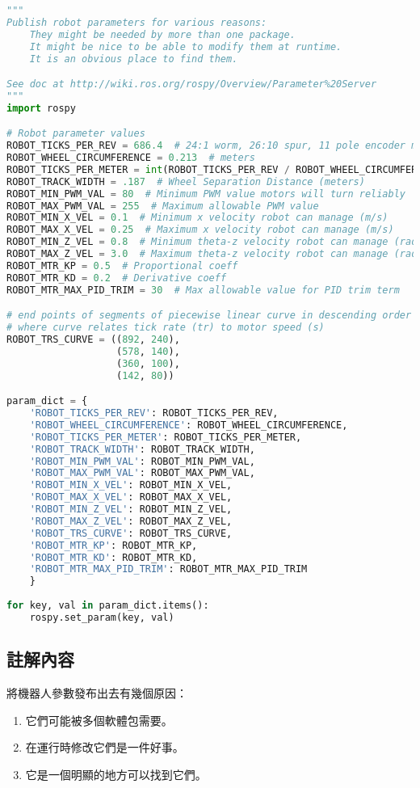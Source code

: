 
\begin{lstlisting}[language=Python, caption=publish\_params.py]
    """
Publish robot parameters for various reasons:
    They might be needed by more than one package.
    It might be nice to be able to modify them at runtime.
    It is an obvious place to find them.

See doc at http://wiki.ros.org/rospy/Overview/Parameter%20Server
"""
import rospy

# Robot parameter values
ROBOT_TICKS_PER_REV = 686.4  # 24:1 worm, 26:10 spur, 11 pole encoder magnet
ROBOT_WHEEL_CIRCUMFERENCE = 0.213  # meters
ROBOT_TICKS_PER_METER = int(ROBOT_TICKS_PER_REV / ROBOT_WHEEL_CIRCUMFERENCE)
ROBOT_TRACK_WIDTH = .187  # Wheel Separation Distance (meters)
ROBOT_MIN_PWM_VAL = 80  # Minimum PWM value motors will turn reliably
ROBOT_MAX_PWM_VAL = 255  # Maximum allowable PWM value
ROBOT_MIN_X_VEL = 0.1  # Minimum x velocity robot can manage (m/s)
ROBOT_MAX_X_VEL = 0.25  # Maximum x velocity robot can manage (m/s)
ROBOT_MIN_Z_VEL = 0.8  # Minimum theta-z velocity robot can manage (rad/s)
ROBOT_MAX_Z_VEL = 3.0  # Maximum theta-z velocity robot can manage (rad/s)
ROBOT_MTR_KP = 0.5  # Proportional coeff
ROBOT_MTR_KD = 0.2  # Derivative coeff
ROBOT_MTR_MAX_PID_TRIM = 30  # Max allowable value for PID trim term

# end points of segments of piecewise linear curve in descending order
# where curve relates tick rate (tr) to motor speed (s)
ROBOT_TRS_CURVE = ((892, 240),
                   (578, 140),
                   (360, 100),
                   (142, 80))

param_dict = {
    'ROBOT_TICKS_PER_REV': ROBOT_TICKS_PER_REV,
    'ROBOT_WHEEL_CIRCUMFERENCE': ROBOT_WHEEL_CIRCUMFERENCE,
    'ROBOT_TICKS_PER_METER': ROBOT_TICKS_PER_METER,
    'ROBOT_TRACK_WIDTH': ROBOT_TRACK_WIDTH,
    'ROBOT_MIN_PWM_VAL': ROBOT_MIN_PWM_VAL,
    'ROBOT_MAX_PWM_VAL': ROBOT_MAX_PWM_VAL,
    'ROBOT_MIN_X_VEL': ROBOT_MIN_X_VEL,
    'ROBOT_MAX_X_VEL': ROBOT_MAX_X_VEL,
    'ROBOT_MIN_Z_VEL': ROBOT_MIN_Z_VEL,
    'ROBOT_MAX_Z_VEL': ROBOT_MAX_Z_VEL,
    'ROBOT_TRS_CURVE': ROBOT_TRS_CURVE,
    'ROBOT_MTR_KP': ROBOT_MTR_KP,
    'ROBOT_MTR_KD': ROBOT_MTR_KD,
    'ROBOT_MTR_MAX_PID_TRIM': ROBOT_MTR_MAX_PID_TRIM
    }
    
for key, val in param_dict.items():
    rospy.set_param(key, val)

\end{lstlisting}

\subsection{註解內容}
將機器人參數發布出去有幾個原因：
\begin{enumerate}
    \item 它們可能被多個軟體包需要。
    \item 在運行時修改它們是一件好事。
    \item 它是一個明顯的地方可以找到它們。
\end{enumerate}

